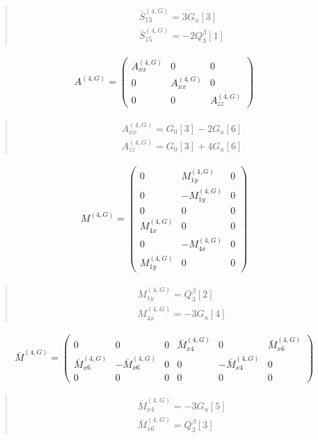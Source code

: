 \documentclass[fleqn,10pt]{jsarticle}
\begin{document}
\begin{quote}
\begin{align*}
& \bar{S}^{(4,G)}_{13} = 3 G_{u}[3] \\
& \bar{S}^{(4,G)}_{15} = - 2 Q_{3}^{\beta}[1]
\end{align*}
\end{quote}
\begin{align*}
A^{(4,G)} = \begin{pmatrix} A^{(4,G)}_{xx} & 0 & 0 \\ 0 & A^{(4,G)}_{xx} & 0 \\ 0 & 0 & A^{(4,G)}_{zz} \end{pmatrix}
\end{align*}
\begin{quote}
\begin{align*}
& A^{(4,G)}_{xx} = G_{0}[3] - 2 G_{u}[6] \\
& A^{(4,G)}_{zz} = G_{0}[3] + 4 G_{u}[6]
\end{align*}
\end{quote}
\begin{align*}
M^{(4,G)} = \begin{pmatrix} 0 & M^{(4,G)}_{1y} & 0 \\ 0 & - M^{(4,G)}_{1y} & 0 \\ 0 & 0 & 0 \\ M^{(4,G)}_{4x} & 0 & 0 \\ 0 & - M^{(4,G)}_{4x} & 0 \\ M^{(4,G)}_{1y} & 0 & 0 \end{pmatrix}
\end{align*}
\begin{quote}
\begin{align*}
& M^{(4,G)}_{1y} = Q_{3}^{\beta}[2] \\
& M^{(4,G)}_{4x} = - 3 G_{u}[4]
\end{align*}
\end{quote}
\begin{align*}
\bar{M}^{(4,G)} = \begin{pmatrix} 0 & 0 & 0 & \bar{M}^{(4,G)}_{x4} & 0 & \bar{M}^{(4,G)}_{x6} \\ \bar{M}^{(4,G)}_{x6} & - \bar{M}^{(4,G)}_{x6} & 0 & 0 & - \bar{M}^{(4,G)}_{x4} & 0 \\ 0 & 0 & 0 & 0 & 0 & 0 \end{pmatrix}
\end{align*}
\begin{quote}
\begin{align*}
& \bar{M}^{(4,G)}_{x4} = - 3 G_{u}[5] \\
& \bar{M}^{(4,G)}_{x6} = Q_{3}^{\beta}[3]
\end{align*}
\end{quote}
\end{document}
